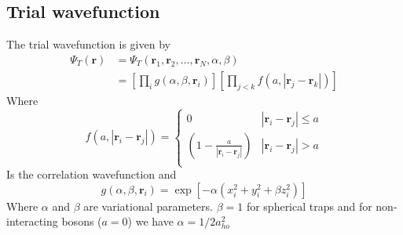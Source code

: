 \documentclass[
    a4paper, aps, twocolumn, floatfix, superscriptaddress,
    nofootinbib]{revtex4-1}
\begin{document}
\newpage
\printbibliography

\newpage
\begin{appendices}

\section{Trial wavefunction}
The trial wavefunction is given by
\begin{align}\label{trial_wavefunction}
    \Psi_T(\boldsymbol{r}) &= \Psi_T(\boldsymbol{r}_1,\boldsymbol{r}_2,...,\boldsymbol{r}_N,\alpha,\beta) \\
    &= \left[\prod_i g(\alpha,\beta,\boldsymbol{r}_i)\right] \left[\prod_{j<k} f(a,|\boldsymbol{r}_j - \boldsymbol{r}_k|)\right] \nonumber
\end{align}
Where
\begin{equation}\label{eq:2}
    f(a,|\boldsymbol{r}_i - \boldsymbol{r}_j|) =
    \begin{cases}
      0 & |\boldsymbol{r}_i - \boldsymbol{r}_j|\leq a \\
     \left(1-\frac{a}{|\boldsymbol{r}_i - \boldsymbol{r}_j|}\right) & |\boldsymbol{r}_i - \boldsymbol{r}_j| > a\\
    \end{cases} 
\end{equation}
Is the correlation wavefunction and 
\begin{equation}
    g(\alpha, \beta, \boldsymbol{r}_i) =  \exp[-\alpha(x_i^2 + y_i^2 + \beta z_i^2)]
\end{equation}
Where $\alpha$ and $\beta$ are variational parameters. $\beta = 1$ for spherical traps  and for non-interacting bosons ($a=0$) we have $\alpha = 1/2a_{ho}^2$ 
\newline

\end{appendices}
\end{document}

